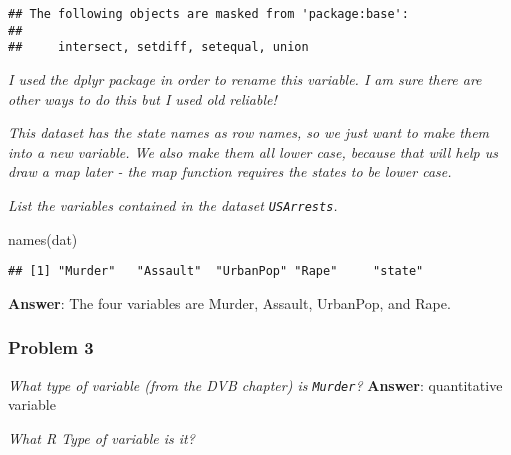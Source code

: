 \documentclass[
]{article}
\newenvironment{Shaded}{\begin{snugshade}}{\end{snugshade}}
\newcommand{\FunctionTok}[1]{\textcolor[rgb]{0.00,0.00,0.00}{#1}}
\newcommand{\NormalTok}[1]{#1}
\newcommand{\OtherTok}[1]{\textcolor[rgb]{0.56,0.35,0.01}{#1}}
\newcommand{\SpecialCharTok}[1]{\textcolor[rgb]{0.00,0.00,0.00}{#1}}
\begin{document}
\begin{verbatim}
## The following objects are masked from 'package:base':
## 
##     intersect, setdiff, setequal, union
\end{verbatim}

\begin{Shaded}
\end{Shaded}

\emph{I used the dplyr package in order to rename this variable. I am
sure there are other ways to do this but I used old reliable!}

\emph{This dataset has the state names as row names, so we just want to
make them into a new variable. We also make them all lower case, because
that will help us draw a map later - the map function requires the
states to be lower case.}

\emph{List the variables contained in the dataset \texttt{USArrests}.}

\begin{Shaded}
\begin{Highlighting}[]
\FunctionTok{names}\NormalTok{(dat)}
\end{Highlighting}
\end{Shaded}

\begin{verbatim}
## [1] "Murder"   "Assault"  "UrbanPop" "Rape"     "state"
\end{verbatim}

\textbf{Answer}: The four variables are Murder, Assault, UrbanPop, and
Rape.

\hypertarget{problem-3}{%
\subsubsection{Problem 3}\label{problem-3}}

\emph{What type of variable (from the DVB chapter) is \texttt{Murder}? }
\textbf{Answer}: quantitative variable

\emph{What R Type of variable is it?}

\begin{Shaded}
\end{Shaded}
\end{document}
